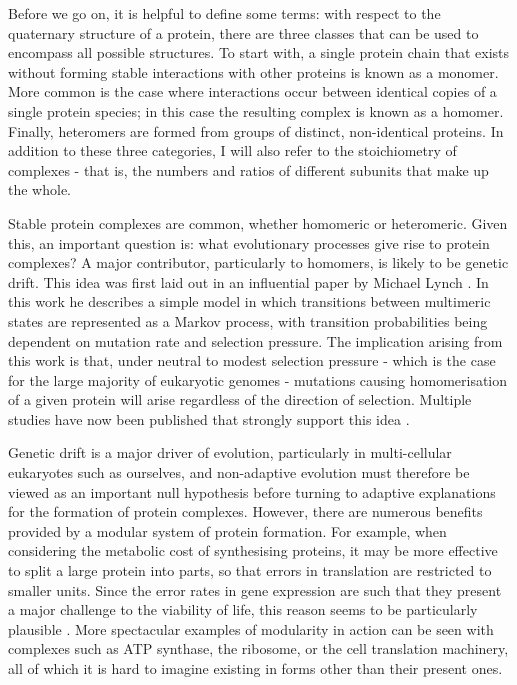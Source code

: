 \documentclass[a4paper,11pt,twoside,openright]{scrbook}
\begin{document}
Before we go on, it is helpful to define some terms: with respect to the
quaternary structure of a protein, there are three classes that can be used to
encompass all possible structures. To start with, a single protein chain that
exists without forming stable interactions with other proteins is known as a
monomer. More common is the case where interactions occur between identical
copies of a single protein species; in this case the resulting complex is known
as a homomer. Finally, heteromers are formed from groups of distinct,
non-identical proteins. In addition to these three categories, I will also refer
to the stoichiometry of complexes - that is, the numbers and ratios of different
subunits that make up the whole.

Stable protein complexes are common, whether homomeric or heteromeric. Given
this, an important question is: what evolutionary processes give rise to protein
complexes? A major contributor, particularly to homomers, is likely to be
genetic drift. This idea was first laid out in an influential paper by Michael
Lynch \cite{Lynch2013}. In this work he describes a simple model in which
transitions between multimeric states are represented as a Markov process, with
transition probabilities being dependent on mutation rate and selection
pressure. The implication arising from this work is that, under neutral to
modest selection pressure - which is the case for the large majority of
eukaryotic genomes - mutations causing homomerisation of a given protein will
arise regardless of the direction of selection. Multiple studies have now been
published that strongly support this idea
\cite{Dayhoff2010,Alexander2017,Garcia-Seisdedos2017}.

Genetic drift is a major driver of evolution, particularly in multi-cellular
eukaryotes such as ourselves, and non-adaptive evolution must therefore be
viewed as an important null hypothesis before turning to adaptive explanations
\cite{Gould1979,Koonin2016} for the formation of protein complexes. However,
there are numerous benefits provided by a modular system of protein formation.
For example, when considering the metabolic cost of synthesising proteins, it
may be more effective to split a large protein into parts, so that errors in
translation are restricted to smaller units. Since the error rates in gene
expression are such that they present a major challenge to the viability of
life, this reason seems to be particularly plausible \cite{Gingold2011}. More
spectacular examples of modularity in action can be seen with complexes such as
ATP synthase, the ribosome, or the cell translation machinery, all of which it
is hard to imagine existing in forms other than their present ones.
\end{document}
